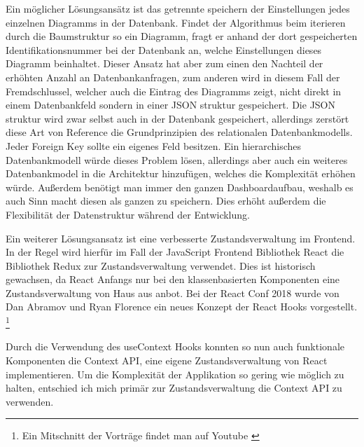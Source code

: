 Ein möglicher Lösungsansätz ist das getrennte speichern der Einstellungen jedes
einzelnen Diagramms in der Datenbank. Findet der Algorithmus beim iterieren durch
die Baumstruktur so ein Diagramm, fragt er anhand der dort gespeicherten 
Identifikationsnummer bei der Datenbank an, welche Einstellungen dieses Diagramm
beinhaltet. Dieser Ansatz hat aber zum einen den Nachteil der erhöhten Anzahl an
Datenbankanfragen, zum anderen wird in diesem Fall der Fremdschlussel, welcher auch
die Eintrag des Diagramms zeigt, nicht direkt in einem Datenbankfeld sondern in einer
JSON struktur gespeichert. Die JSON struktur wird zwar selbst auch in der Datenbank 
gespeichert, allerdings zerstört diese Art von Reference die Grundprinzipien des
relationalen Datenbankmodells. Jeder Foreign Key sollte ein eigenes Feld besitzen.
Ein hierarchisches Datenbankmodell würde dieses Problem lösen, allerdings aber auch
ein weiteres Datenbankmodel in die Architektur hinzufügen, welches die Komplexität
erhöhen würde. Außerdem benötigt man immer den ganzen Dashboardaufbau, weshalb es
auch Sinn macht diesen als ganzen zu speichern. Dies erhöht außerdem die Flexibilität
der Datenstruktur während der Entwicklung.

Ein weiterer Lösungsansatz ist eine verbesserte Zustandsverwaltung im Frontend. In der
Regel wird hierfür im Fall der JavaScript Frontend Bibliothek React die Bibliothek
Redux zur Zustandsverwaltung verwendet. Dies ist historisch gewachsen, da React Anfangs
nur bei den klassenbasierten Komponenten eine Zustandsverwaltung von Haus aus
anbot. Bei der React Conf 2018 wurde von Dan Abramov und Ryan Florence ein neues
Konzept der React Hooks vorgestellt.
\footnote{Ein Mitschnitt der Vorträge findet man auf Youtube \cite{}}

Durch die Verwendung des useContext Hooks konnten
so nun auch funktionale Komponenten die Context API, eine eigene Zustandsverwaltung von React implementieren.
Um die Komplexität der Applikation so gering wie möglich zu halten, entschied ich mich
primär zur Zustandsverwaltung die Context API zu verwenden.




